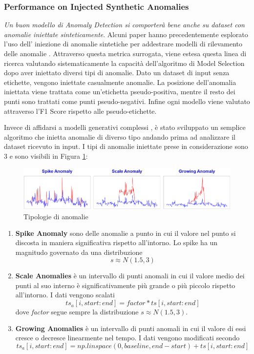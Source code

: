 \subsubsection{Performance on Injected Synthetic Anomalies}
\textit{Un buon modello di Anomaly Detection si comporterà bene anche su dataset con anomalie iniettate sinteticamente}. Alcuni paper hanno precedentemente esplorato l'uso dell' iniezione di anomalie sintetiche per addestrare modelli di rilevamento delle anomalie \cite{DBLP:journals/corr/abs-2107-07702}. Attraverso questa metrica surrogata, viene estesa questa linea di ricerca valutando sistematicamente la capacità dell'algoritmo di Model Selection dopo aver iniettato diversi tipi di anomalie. Dato un dataset di input senza etichette, vengono iniettate casualmente anomalie. La posizione dell'anomalia iniettata viene trattata come un'etichetta pseudo-positiva, mentre il resto dei punti sono trattati come punti pseudo-negativi. 
Infine ogni modello viene valutato attraverso l'F1 Score rispetto alle pseudo-etichette.

Invece di affidarsi a modelli generativi complessi \cite{DBLP:journals/corr/abs-2002-12478}, è stato sviluppato un semplice algoritmo che inietta anomalie di diverso tipo andando prima ad analizzare il dataset ricevuto in input. I tipi di anomalie iniettate prese in considerazione sono 3 e sono visibili in Figura \ref{tipi-anomalie}: 
\begin{figure}[t]
	\centering
	\includegraphics[width=14cm, scale=1]{images/anomalies}
	\caption{Tipologie di anomalie}
	\label{tipi-anomalie}
		
\end{figure}


\begin{enumerate}
	\item \textbf{Spike Anomaly} sono delle anomalie a punto in cui il valore nel punto si discosta in maniera significativa rispetto all'intorno. Lo spike ha un magnitudo governato da una distribuzione \[s \approx N(1.5, 3) \]
	\item \textbf{Scale Anomalies} è un intervallo di punti anomali in cui il  valore medio dei punti al suo interno è significativamente più grande o più piccolo rispetto all'intorno. I dati vengono scalati \[ ts_a[i, start:end] = factor*ts[i, start:end]\] dove \textit{factor} segue sempre la distribuzione \(s \approx N(1.5, 3) \).
	\item \textbf{Growing Anomalies} è un intervallo di punti anomali in cui il valore di essi cresce o decresce linearmente nel tempo. I dati vengono modificati secondo \[ ts_a[i, start:end] = np.linspace(0, baseline, end-start) + ts[i, start:end] \] 
\end{enumerate}

